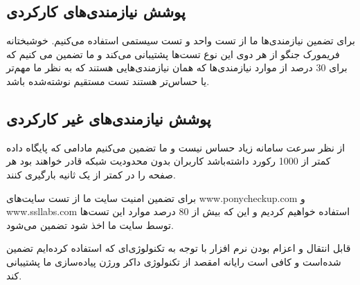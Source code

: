 \subsection* {پوشش نیازمندی‌های کارکردی}
‌برای تضمین نیازمندی‌ها ما از تست واحد و تست سیستمی استفاده می‌کنیم. خوشبختانه ‌فریمورک جنگو از هر دوی این نوع تست‌ها پشتیبانی می‌کند و ما تضمین می کنیم که برای 30 درصد از موارد نیازمندی‌ها که همان نیازمندی‌هایی هستند که به نظر ما مهم‌تر یا حساس‌تر هستند تست مستقیم نوشته‌شده باشد.
\subsection* {پوشش نیازمندی‌های غیر کارکردی}
از نظر سرعت سامانه زیاد حساس نیست و ما تضمین می‌کنیم مادامی که پایگاه داده کمتر از 1000 رکورد داشته‌باشد کاربران بدون محدودیت شبکه قادر خواهند بود هر صفحه را در کمتر از یک ثانیه بارگیری کنند. 

برای تضمین امنیت سایت ما از تست سایت‌های www.ponycheckup.com و www.ssllabs.com استفاده خواهیم کردیم  و این که بیش از 80 درصد موارد این تست‌ها توسط سایت ما اخذ شود تضمین می‌شود. 

قابل انتقال و اعزام بودن نرم افزار با توجه به تکنولوژی‌ای که استفاده کرده‌ایم تضمین شده‌است و کافی است رایانه امقصد از تکنولوژی داکر ورژن پیاده‌سازی ما پشتیبانی کند. 
